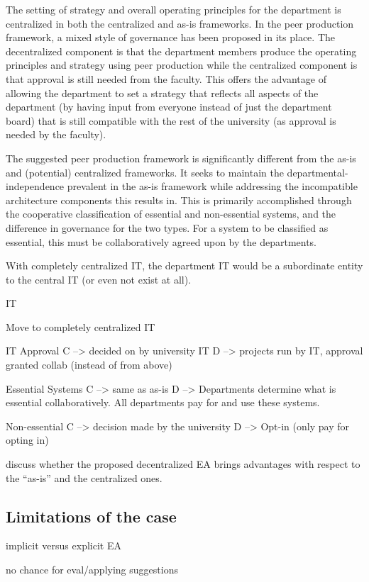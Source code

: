 The setting of strategy and overall operating principles for the department is centralized in both the centralized and as-is frameworks. In the peer production framework, a mixed style of governance has been proposed in its place. The decentralized component is that the department members produce the operating principles and strategy using peer production while the centralized component is that approval is still needed from the faculty. This offers the advantage of allowing the department to set a strategy that reflects all aspects of the department (by having input from everyone instead of just the department board) that is still compatible with the rest of the university (as approval is needed by the faculty).





The suggested peer production framework is significantly different from the as-is and (potential) centralized frameworks. It seeks to maintain the departmental-independence prevalent in the as-is framework while addressing the incompatible architecture components this results in. This is primarily accomplished through the cooperative classification of essential and non-essential systems, and the difference in governance for the two types. For a system to be classified as essential, this must be collaboratively agreed upon by the departments. 

With completely centralized IT, the department IT would be a subordinate entity to the central IT (or even not exist at all). 

IT 

Move to completely centralized IT

IT Approval
 C --> decided on by university IT
 D --> projects run by IT, approval granted collab (instead of from above)

Essential Systems 
 C --> same as as-is
 D --> Departments determine what is essential collaboratively. All departments pay for and use these systems.

Non-essential
 C --> decision made by the university
 D --> Opt-in (only pay for opting in)

discuss whether the proposed decentralized EA brings advantages with respect to the ``as-is'' and the centralized ones. 

\subsection{Limitations of the case}

implicit versus explicit EA

no chance for eval/applying suggestions




  